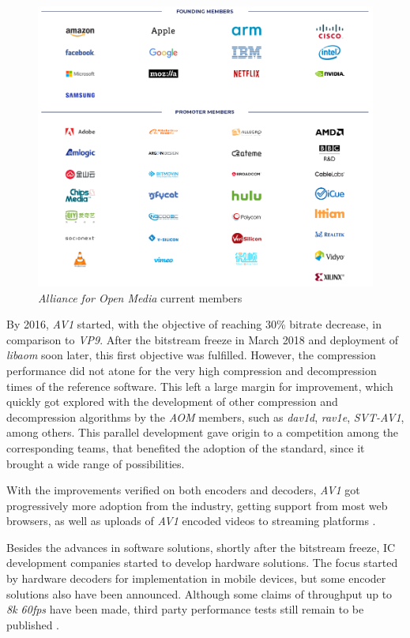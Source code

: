 \begin{figure}[!htbp]
    \centering
    \includegraphics[width=\textwidth]{Sections/3AV1/Diagrams/Images/AOM.png}
    \caption[\emph{Alliance for Open Media} current members]{\emph{Alliance for Open Media} current members \cite{aomediaHome}} 
    \label{fig:aom}
\end{figure}

By 2016, \emph{AV1} started, with the objective of reaching 30\% bitrate decrease, in comparison to \emph{VP9}. After the bitstream freeze in March 2018 and deployment of \emph{libaom} soon later, this first objective was fulfilled. However, the compression performance did not atone for the very high compression and decompression times of the reference software. This left a large margin for improvement, which quickly got explored with the development of other compression and decompression algorithms by the \emph{AOM} members, such as \emph{dav1d}, \emph{rav1e}, \emph{SVT-AV1},  among others. This parallel development gave origin to a competition among the corresponding teams, that benefited the adoption of the standard, since it brought a wide range of possibilities. 

With the improvements verified on both encoders and decoders, \emph{AV1} got progressively more adoption from the industry, getting support from most web browsers, as well as uploads of \emph{AV1} encoded videos to streaming platforms \cite{eggeLatestTechnicalBusiness2019}.

Besides the advances in software solutions, shortly after the bitstream freeze, IC development companies started to develop hardware solutions. The focus started by hardware decoders for implementation in mobile devices, but some encoder solutions also have been announced. Although some claims of throughput up to \emph{8k 60fps} have been made, third party performance tests still remain to be published \cite{AllegroDVTIntroduces2019,NGCodecAnnouncesAV1, shilovRealtekDemonstratesRTD2893, RealtekLaunchesWorldwide, SocionextImplementsAV12018}.

